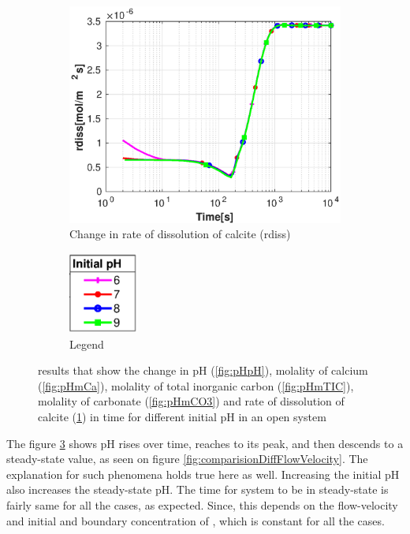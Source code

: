 \begin{figure}[!h]
    \hfill
    \begin{subfigure}{.5\linewidth}
            \centering
        \includegraphics[width=\textwidth]{PICTURES/with_pH_rdiss.eps}
        \caption{Change in rate of dissolution of calcite (rdiss)}
        \label{fig:pHrdiss}
    \end{subfigure}%
  \hfill
  \begin{subfigure}{.5\linewidth}
            \centering
        \includegraphics[width=0.25\textwidth]{PICTURES/with_pH_legend.eps}
        \caption{Legend}
        \label{fig:pHlegend}
    \end{subfigure}%
    \caption{\DuMuX results that show the change in pH (\cref{fig:pHpH}), molality of calcium (\cref{fig:pHmCa}), 
    molality of total inorganic carbon (\cref{fig:pHmTIC}), molality of carbonate (\cref{fig:pHmCO3}) and rate of 
    dissolution of calcite (\cref{fig:pHrdiss}) in time for different initial pH in an open system}
    \label{fig:comparisionDiffInitialpH}
\end{figure}


The figure \ref{fig:comparisionDiffInitialpH} shows pH rises over time, reaches to its peak, and then descends to a steady-state value, as seen on figure \ref{fig:comparisionDiffFlowVelocity}. The explanation for such phenomena holds true here as well. Increasing the initial pH also increases the steady-state pH. The time for system to be in steady-state is fairly same for all the cases, as expected. Since, this depends on the flow-velocity and initial and boundary concentration of , which is constant for all the cases. 

